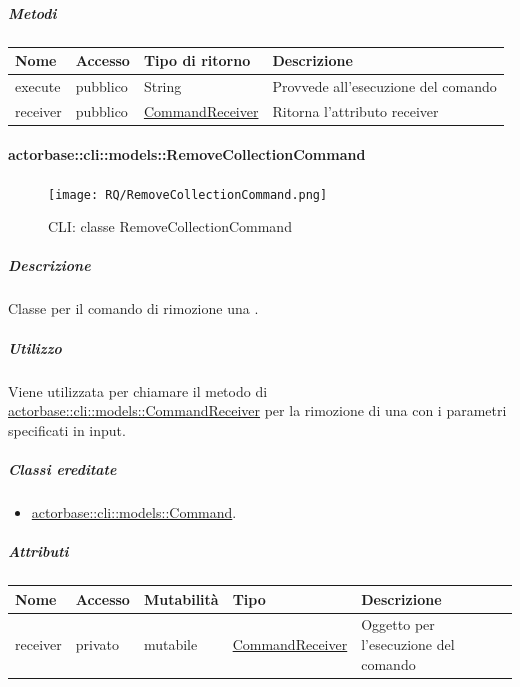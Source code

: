 \documentclass{scalatekids-article}
\begin{document}
\subparagraph{Metodi}

\begin{tabular}{| l | l | l | l |}
  \hline
  Nome & Accesso & Tipo di ritorno & Descrizione\\
  \hline
  execute & pubblico & String & Provvede all'esecuzione del comando\\
  \hline
  receiver & pubblico & \hyperref[sec:actorbase::cli::models::CommandReceiver]{CommandReceiver} & Ritorna l'attributo receiver\\
  \hline
\end{tabular}

\paragraph{actorbase::cli::models::RemoveCollectionCommand}
\label{sec:actorbase::cli::models::RemoveCollectionCommand}

\begin{figure}[H]
  \begin{center}
    \texttt{[image: RQ/RemoveCollectionCommand.png]}
    \caption{CLI: classe RemoveCollectionCommand}
  \end{center}
\end{figure}

\subparagraph{Descrizione}

Classe per il comando di rimozione una .

\subparagraph{Utilizzo}

Viene utilizzata per chiamare il metodo di
\hyperref[sec:actorbase::cli::models::CommandReceiver]{actorbase::cli::models::CommandReceiver} per la rimozione di una  con
i parametri specificati in input.

\subparagraph{Classi ereditate}

\begin{itemize}
\item \hyperref[sec:actorbase::cli::models::Command]{actorbase::cli::models::Command}.
\end{itemize}

\subparagraph{Attributi}

\begin{tabular}{| p{1cm} | p{1.5cm} | p{2cm} | p{4cm} | p{8.5cm} |}
  \hline
  Nome & Accesso & Mutabilità & Tipo & Descrizione\\
  \hline
  receiver & privato & mutabile & \hyperref[sec:actorbase::cli::models::CommandReceiver]{CommandReceiver} & Oggetto per l'esecuzione del comando\\
  \hline
\end{tabular}
\end{document}
